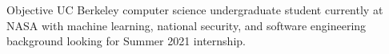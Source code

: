 \begin{rSection}{Objective}
UC Berkeley computer science undergraduate student currently at NASA with machine learning, national security, and software engineering background looking for Summer 2021 internship.
\end{rSection}